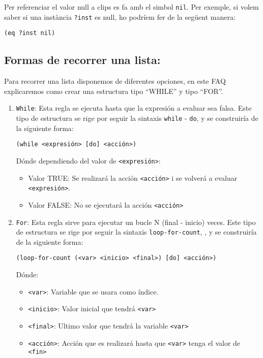 \documentclass[11pt,svgnames]{scrbook}
\begin{document}
Per referenciar el valor null a clips es fa amb el simbol \texttt{nil}. Per
exemple, si volem saber si una instància \texttt{?inst} es null, ho podríem fer
de la següent manera:
\medskip

\texttt{(eq ?inst nil)}


\subsection{Formas de recorrer una lista:}

Para recorrer una lista disponemos de diferentes opciones, en este FAQ
explicaremos como crear una estructura tipo ``WHILE'' y tipo ``FOR''.

\begin{enumerate}
 \item \texttt{While}: Esta regla se ejecuta hasta que la expresión a evaluar sea falsa. Este tipo de
 estructura se rige por seguir la sintaxis \texttt{while} - \texttt{do}, y se construiría de la
siguiente forma:


\texttt{(while  <expresión>  [do]  <acción>)}

	Dónde dependiendo del valor de  \texttt{<expresión>}:

\begin{itemize}
 \item Valor  TRUE: Se realizará la acción \texttt{<acción>} i se volverá a evaluar \texttt{<expresión>}.
\item Valor  FALSE:  No se ejecutará la acción \texttt{<acción>}

\end{itemize}



\item \texttt{For}: Esta regla sirve para ejecutar un bucle N (final - inicio) veces. Este tipo de
estructura se rige por seguir la sintaxis \texttt{loop-for-count}, , y se construiría de la
siguiente forma:

\texttt{(loop-for-count   (<var>  <inicio>   <final>)  [do]   <acción>)}


Dónde:

\begin{itemize}
 \item \texttt{<var>}:  Variable que se usara como índice.
\item \texttt{<inicio>}:  Valor inicial que tendrá \texttt{<var>}
\item \texttt{<final>}:  Ultimo valor que tendrá la variable \texttt{<var>}
\item \texttt{<acción>}: Acción que es realizará hasta que \texttt{<var>} tenga el valor de \texttt{<fin>}
\end{itemize}


\end{enumerate}
\end{document}
